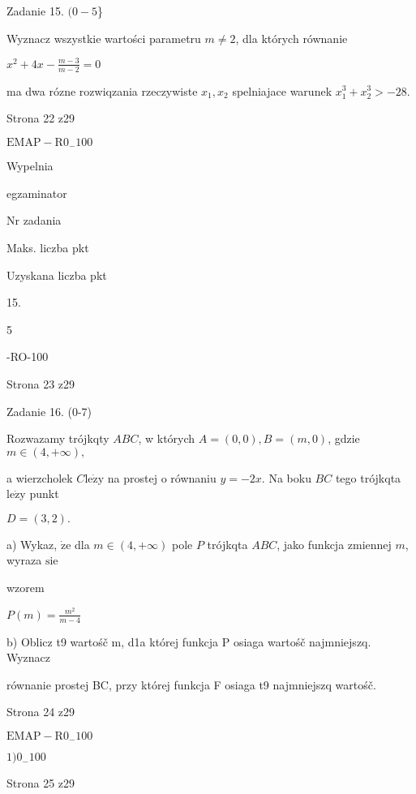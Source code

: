 \documentclass[a4paper,12pt]{article}
\begin{document}
Zadanie 15. $(0-5$\}

Wyznacz wszystkie wartości parametru $m\neq 2$, dla których równanie

$x^{2}+4x-\displaystyle \frac{m-3}{m-2}=0$

ma dwa rózne rozwiqzania rzeczywiste $x_{1}, x_{2}$ spelniajace warunek $x_{1}^{3}+x_{2}^{3}>-28.$

Strona 22 z29

$\mathrm{E}\mathrm{M}\mathrm{A}\mathrm{P}-\mathrm{R}0_{-}100$





Wypelnia

egzaminator

Nr zadania

Maks. liczba pkt

Uzyskana liczba pkt

15.

5

-RO-100

Strona 23 z29





Zadanie 16. (0-7)

Rozwazamy trójkqty $ABC$, w których $A=(0,0), B=(m,0)$, gdzie $m\in(4,+\infty),$

a wierzcholek $C \mathrm{l}\mathrm{e}\dot{\mathrm{z}}\mathrm{y}$ na prostej o równaniu $y=-2x$. Na boku $BC$ tego trójkqta $\mathrm{l}\mathrm{e}\dot{\mathrm{z}}\mathrm{y}$ punkt

$D=(3,2).$

a) Wykaz, $\dot{\mathrm{z}}\mathrm{e}$ dla $m\in(4,+\infty)$ pole $P$ trójkqta $ABC$, jako funkcja zmiennej $m$, wyraza $\mathrm{s}\mathrm{i}\mathrm{e}$

wzorem

$P(m)=\displaystyle \frac{m^{2}}{m-4}$

b) Oblicz t9 wartośč m, d1a której funkcja P osiaga wartośč najmniejszq. Wyznacz

równanie prostej BC, przy której funkcja F osiaga t9 najmniejszq wartośč.

Strona 24 z29

$\mathrm{E}\mathrm{M}\mathrm{A}\mathrm{P}-\mathrm{R}0_{-}100$





$1)0_{-}100$

Strona 25 z29
\end{document}
